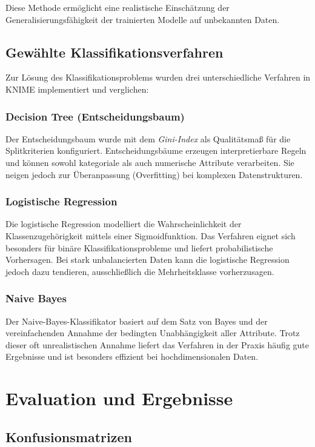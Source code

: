 Diese Methode ermöglicht eine realistische Einschätzung der Generalisierungsfähigkeit 
der trainierten Modelle auf unbekannten Daten.

\subsection{Gewählte Klassifikationsverfahren}

Zur Lösung des Klassifikationsproblems wurden drei unterschiedliche Verfahren 
in KNIME implementiert und verglichen:

\subsubsection{Decision Tree (Entscheidungsbaum)}
Der Entscheidungsbaum wurde mit dem \textit{Gini-Index} als Qualitätsmaß für die 
Splitkriterien konfiguriert. Entscheidungsbäume erzeugen interpretierbare Regeln 
und können sowohl kategoriale als auch numerische Attribute verarbeiten. 
Sie neigen jedoch zur Überanpassung (Overfitting) bei komplexen Datenstrukturen.

\subsubsection{Logistische Regression}
Die logistische Regression modelliert die Wahrscheinlichkeit der Klassenzugehörigkeit 
mittels einer Sigmoidfunktion. Das Verfahren eignet sich besonders für binäre 
Klassifikationsprobleme und liefert probabilistische Vorhersagen. Bei stark 
unbalancierten Daten kann die logistische Regression jedoch dazu tendieren, 
ausschließlich die Mehrheitsklasse vorherzusagen.

\subsubsection{Naive Bayes}
Der Naive-Bayes-Klassifikator basiert auf dem Satz von Bayes und der vereinfachenden 
Annahme der bedingten Unabhängigkeit aller Attribute. Trotz dieser oft unrealistischen 
Annahme liefert das Verfahren in der Praxis häufig gute Ergebnisse und ist 
besonders effizient bei hochdimensionalen Daten.

\section{Evaluation und Ergebnisse}

\subsection{Konfusionsmatrizen}

